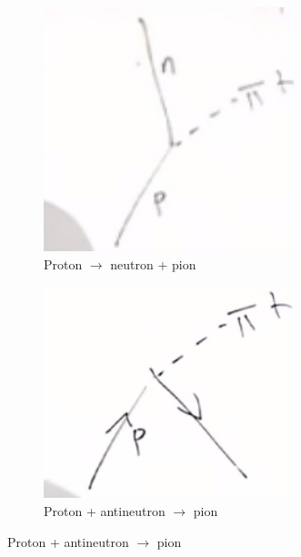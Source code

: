 \documentclass[]{article}
\begin{document}
\begin{figure}[H]
	\caption{Two processes from the same interaction.}
	\begin{subfigure}{0.45\textwidth}
		\caption{Proton $\rightarrow$ neutron + pion}
		\includegraphics[width=0.8\textwidth]{pion1}
	\end{subfigure}
	\begin{subfigure}{0.45\textwidth}
		\caption{Proton + antineutron $\rightarrow$ pion}
		\includegraphics[width=0.8\textwidth]{pion2}
	\end{subfigure}
\end{figure}
\end{document}
